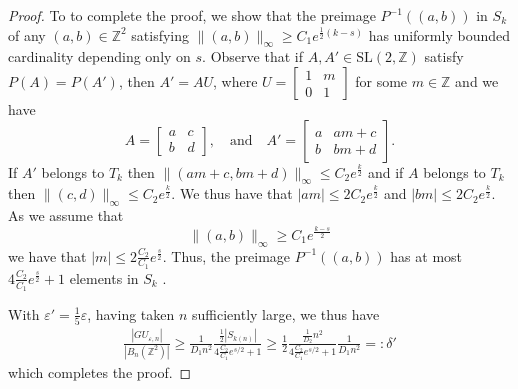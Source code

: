 \documentclass[10pt,reqno]{amsart}
\theoremstyle{Theorem}
\theoremstyle{definition}
\theoremstyle{remark}
\newcommand{\note}[1]{\marginpar{{\color{red}\footnotesize \begin{spacing}{1}#1\end{spacing}}}}
\renewcommand{\epsilon}{\varepsilon}
\newcommand{\Z}{\mathbb {Z}}
\newcommand{\e}{\epsilon}
\newcommand{\Sl}{\mathrm{SL}}
\def\red{\color{red}}
\def\blue{}
\begin{document}
\begin{proof}
To to complete the proof, we show that the preimage $P^{-1} ((a,b))$ {\blue in $S_k$} of any $(a,b)\in \Z^2$ {\blue satisfying $\|(a,b)\|_\infty \geq C_1e^{ \frac{1}{2}{(k-s)} }$} has uniformly bounded cardinality  depending only on  $s$.
 Observe that if $A,A'\in \Sl(2,\Z)$  satisfy $P(A) = P(A')$, then $A' = AU$, where $U = \begin{bmatrix} 1&m\\0&1 \end{bmatrix}$ for some $m \in \Z$ and we have %
 $$A=   \begin{bmatrix} a& c\\b&  d \end{bmatrix},\quad \text{and} \quad A' =   \begin{bmatrix} a&am+ c\\b&bm + d \end{bmatrix}.$$
If $A'$ belongs to $T_k$ then $\|(am +c, bm+d)\|_\infty \leq C_2e^{\frac{k}{2}}$ and if $A$ belongs to $T_k$ then $\|(c, d)\|_\infty \leq C_2e^{\frac{k}{2}}$.
We thus have   that $|am|\le 2 C_2 e^{{\blue \frac{k}{2}}}$ and  $|bm|\le 2 C_2 e^{{\blue \frac{k}{2}}}$.
As we assume that $$\|(a,b)\|_\infty \geq C_1e^{ \frac{k-s}{2} }$$ we have that  $|m|\le  2\frac{C_2}{C_1}e^{{{\blue \frac{s}{2}}}}$.  Thus, the preimage $P^{-1}((a,b))$  has  at most $4\frac{C_2}{C_1}e^{{{\blue \frac{s}{2}}}} +1$ elements {\blue in $S_k$} .


With $\epsilon'=\frac 1 5 \epsilon$, having taken $n$ sufficiently large, we thus have
{\blue \begin{align*}\frac{|GU_{\e,n}|}{|B_n(\Z^2)|} \ge \frac {1} {D_1n^2} {\frac{\frac{1}{2}|S_{k(n)} |}{4\frac{C_2}{C_1}e^{s/2} +1  }}\ge
 \frac{1}{2} \frac{ \frac{1}{D_2}n^2} {4\frac{C_2}{C_1}e^{s/2} +1}  \frac{1}{D_1n^2}=:\delta'
\end{align*}}
which completes the proof.\end{proof}

\end{document}
